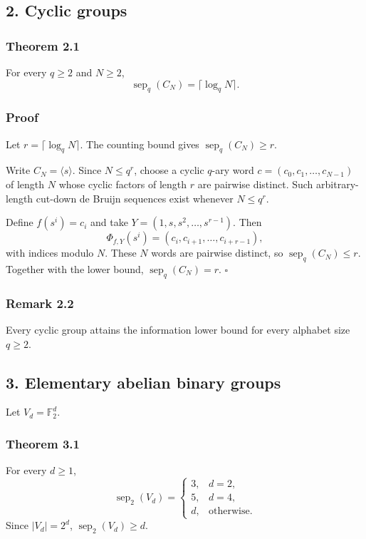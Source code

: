 \documentclass[
]{article}
\begin{document}
\subsection{2. Cyclic groups}
\subsubsection{Theorem 2.1}
For every \(q\ge2\) and \(N\ge2\),
\[
\boxed{\operatorname{sep}_q(C_N)=\lceil\log_qN\rceil.}
\]
\subsubsection{Proof}
Let \(r=\lceil\log_qN\rceil\). The counting bound gives \(\operatorname{sep}_q(C_N)\ge r\).

Write \(C_N=\langle s\rangle\). Since \(N\le q^r\), choose a cyclic \(q\)-ary word \(c=(c_0,c_1,\ldots,c_{N-1})\) of length \(N\) whose cyclic factors of length \(r\) are pairwise distinct. Such arbitrary-length cut-down de Bruijn sequences exist whenever \(N\le q^r\).

Define \(f(s^i)=c_i\) and take \(Y=(1,s,s^2,\ldots,s^{r-1})\). Then
\[
\Phi_{f,Y}(s^i)=(c_i,c_{i+1},\ldots,c_{i+r-1}),
\]
with indices modulo \(N\). These \(N\) words are pairwise distinct, so \(\operatorname{sep}_q(C_N)\le r\). Together with the lower bound, \(\operatorname{sep}_q(C_N)=r\). \(\square\)

\subsubsection{Remark 2.2}
Every cyclic group attains the information lower bound for every alphabet size \(q\ge2\).

\subsection{3. Elementary abelian binary groups}
Let \(V_d=\mathbb F_2^d\).

\subsubsection{Theorem 3.1}
For every \(d\ge1\),
\[
\boxed{\operatorname{sep}_2(V_d)=
\begin{cases}
3,&d=2,\\
5,&d=4,\\
d,&\text{otherwise}.
\end{cases}}
\]
Since \(|V_d|=2^d\), \(\operatorname{sep}_2(V_d)\ge d\).
\end{document}
